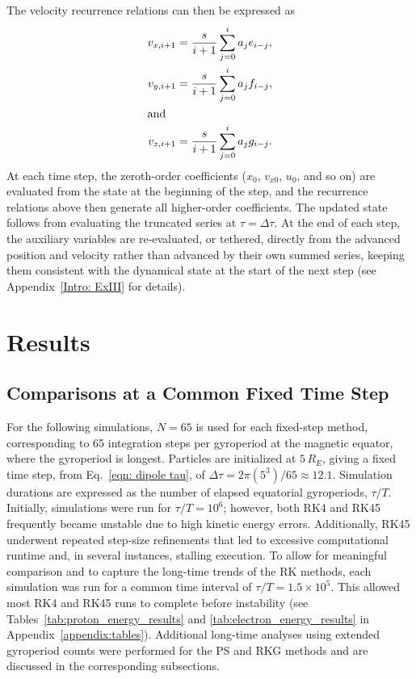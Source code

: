 \documentclass{article}
\begin{document}
The velocity recurrence relations can then be expressed as
        \begin{align*}
            v_{x, i+1} &=  \frac{s}{i+1} \sum_{j=0}^i a_j e_{i-j}, \\
            v_{y, i+1} &=   \frac{s}{i+1} \sum_{j=0}^i a_j f_{i-j}, \\
      \intertext{and}
            v_{z, i+1} &=   \frac{s}{i+1} \sum_{j=0}^i a_j g_{i-j}.
        \end{align*}
At each time step, the zeroth-order coefficients ($x_0$, $v_{x0}$, $u_0$, and so on) are evaluated from the state at the beginning of the step, and the recurrence relations above then generate all higher-order coefficients. The updated state follows from evaluating the truncated series at $\tau = \Delta\tau$. At the end of each step, the auxiliary variables are re-evaluated, or tethered, directly from the advanced position and velocity rather than advanced by their own summed series, keeping them consistent with the dynamical state at the start of the next step (see Appendix~\ref{Intro: ExIII} for details).

\section{Results}\label{SEC:results}

\subsection{Comparisons at a Common Fixed Time Step}
For the following simulations, $N=65$ is used for each fixed-step method, corresponding to 65 integration steps per gyroperiod at the magnetic equator, where the gyroperiod is longest. Particles are initialized at $5\,R_E$, giving a fixed time step, from Eq.~\eqref{eqn: dipole tau}, of $\Delta\tau=2\pi(5^3)/65\approx12.1$. Simulation durations are expressed as the number of elapsed equatorial gyroperiods, $\tau/T$. Initially, simulations were run for $\tau/T=10^{6}$; however, both RK4 and RK45 frequently became unstable due to high kinetic energy errors. Additionally, RK45 underwent repeated step-size refinements that led to excessive computational runtime and, in several instances, stalling execution. To allow for meaningful comparison and to capture the long-time trends of the RK methods, each simulation was run for a common time interval of $\tau/T = 1.5\times 10^{5}$. This allowed most RK4 and RK45 runs to complete before instability (see Tables~\ref{tab:proton_energy_results} and \ref{tab:electron_energy_results} in Appendix~\ref{appendix:tables}). Additional long-time analyses using extended gyroperiod counts were performed for the PS and RKG methods and are discussed in the corresponding subsections. 
\end{document}
